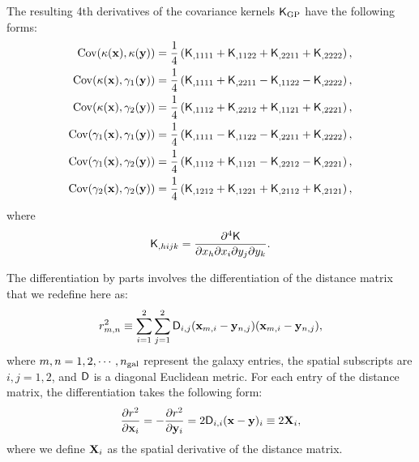The resulting 4th derivatives of the covariance
kernels $\mathsf{K}_{\rm GP}$ have the following forms: 
\begin{align}
	\mathrm{Cov} (\kappa(\mathbf{x}), \kappa(\mathbf{y}))
&= \frac{1}{4}\left(
\mathsf{K}_{,1111} + \mathsf{K}_{,1122} + \mathsf{K}_{,2211} + \mathsf{K}_{,2222}
\right), \label{eq:kernel_derivatives1}\\
\mathrm{Cov}(\kappa(\mathbf{x}), \gamma_1(\mathbf{y})) &= \frac{1}{4}\left(
\mathsf{K}_{,1111} + \mathsf{K}_{,2211} - \mathsf{K}_{,1122} - \mathsf{K}_{,2222}
\right), \\
\mathrm{Cov}(\kappa(\mathbf{x}), \gamma_2(\mathbf{y})) &= \frac{1}{4}\left(
\mathsf{K}_{,1112} + \mathsf{K}_{,2212} + \mathsf{K}_{,1121} + \mathsf{K}_{,2221}
\right),\\
\mathrm{Cov}(\gamma_1(\mathbf{x}), \gamma_1(\mathbf{y})) &= \frac{1}{4}\left(
\mathsf{K}_{,1111} - \mathsf{K}_{,1122} - \mathsf{K}_{,2211} + \mathsf{K}_{,2222}
\right), \\
\mathrm{Cov}(\gamma_1(\mathbf{x}), \gamma_2(\mathbf{y})) &= \frac{1}{4}\left(
\mathsf{K}_{,1112} + \mathsf{K}_{,1121} - \mathsf{K}_{,2212} - \mathsf{K}_{,2221}
\right), \\
\mathrm{Cov}(\gamma_2(\mathbf{x}), \gamma_2(\mathbf{y})) &= \frac{1}{4}\left(
\mathsf{K}_{,1212} + \mathsf{K}_{,1221} + \mathsf{K}_{,2112} + \mathsf{K}_{,2121}
\right), \label{eq:kernel_derivatives2}
\end{align}
where
\begin{equation}
	\mathsf{K}_{,hijk} = \frac{\partial^4 \mathsf{K}}{\partial x_h \partial x_i
	\partial y_j \partial y_k}.
	\label{eq:derivative_kernel}
\end{equation}

The differentiation by parts involves the differentiation of the distance matrix 
that we redefine here as:
\begin{equation}
	r_{m, n}^2 \equiv \sum_{i=1}^2 \sum_{j=1}^2 \mathsf{D}_{i, j}(\mathbf{x}_{m, i} - \mathbf{y}_{n, j}) (\mathbf{x}_{m, i} - \mathbf{y}_{n, j}), 
	\label{eq:distance}
\end{equation}
where $m, n = 1, 2, \cdots, n_{\rm gal}$ represent the galaxy entries, the spatial
subscripts are $i, j = 1,
2$, and $\mathsf{D}$ is a diagonal Euclidean metric.
For each entry of the distance matrix, the differentiation takes the following
form:
\begin{equation}
	\frac{\partial r^2}{\partial \mathbf{x}_i} = -\frac{\partial
	r^2}{\partial \mathbf{y}_i} =
	2 \mathsf{D}_{i, i}(\mathbf{x} - \mathbf{y})_i \equiv 2{\bf X}_i,
\end{equation}
where we define ${\bf X}_i$ as the spatial derivative of the distance matrix.

